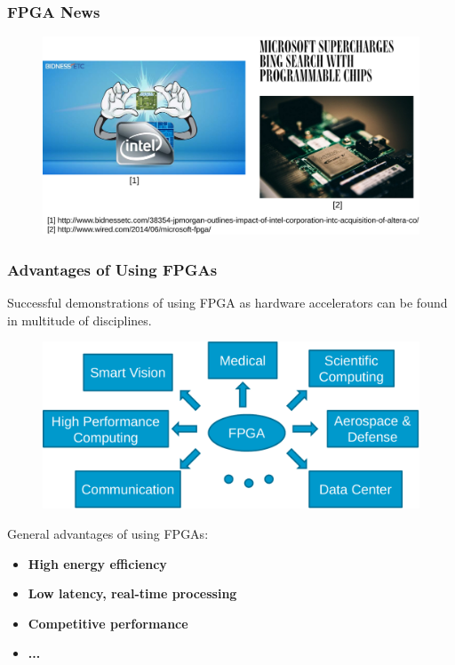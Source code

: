 \documentclass[accentcolor=tud1a,colorbacktitle,inverttitle,landscape,german,presentation,t]{tudbeamer}
\begin{document}
  \begin{frame}
  \frametitle{FPGA News}
  \begin{figure}
     \includegraphics[width=.9\linewidth]{fpga-app2}
   \end{figure}

  \end{frame}
  \begin{frame}
  \frametitle{Advantages of Using FPGAs}
    \vspace{-0.6em}
    Successful demonstrations of using FPGA as hardware accelerators can be found in multitude of disciplines.
    \begin{figure}
      \includegraphics[width=.7\linewidth]{fpga-app}
    \end{figure}
		  
    General advantages of using FPGAs:
    \begin{itemize}
      \item \textbf{High energy efficiency}
      \item \textbf{Low latency, real-time processing}
      \item \textbf{Competitive performance}
      \item \textbf{...}
    \end{itemize}
  \end{frame}
\end{document}
